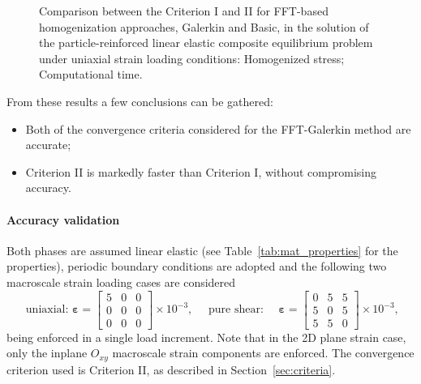 \begin{figure}[hbt]
\begin{subfigure}[b]{0.46\textwidth}
    \caption{}
    \label{subfig:linear_3D_normal_comparison_crit_cpu_time_vs_n_voxels}
  \end{subfigure}
  \caption{Comparison between the Criterion I and II for FFT-based homogenization
  approaches, Galerkin and Basic, in the solution of the particle-reinforced linear elastic
  composite equilibrium problem under uniaxial strain loading conditions:
   Homogenized
  stress; 
  Computational time.} \label{fig:linear_3D_normal_comparison_crit}
\end{figure}

From these results a few conclusions can be gathered:
\begin{itemize}
  \item Both of the convergence criteria considered for the FFT-Galerkin method are accurate;
  \item Criterion II is markedly faster than Criterion I, without compromising accuracy.
\end{itemize}

\FloatBarrier

\paragraph{Accuracy validation}
Both phases are assumed linear elastic (see Table~\ref{tab:mat_properties} for the properties), periodic boundary conditions are adopted and the following two macroscale strain loading cases are considered
\begin{equation}
\text { uniaxial: } \bm{\varepsilon}=\left[\begin{array}{lll}
5 & 0 & 0 \\
0 & 0 & 0 \\
0 & 0 & 0
\end{array}\right] \times 10^{-3}, \quad \text { pure shear: } \quad \bm \varepsilon=\left[\begin{array}{ccc}
0 & 5 & 5 \\
5 & 0 & 5 \\
5 & 5 & 0
\end{array}\right] \times 10^{-3},
\end{equation}
being enforced in a single load increment.
Note that in the 2D plane strain case, only the inplane \(O_{x y}\) macroscale strain components are enforced.
The convergence criterion used is Criterion II, as described in Section~\ref{sec:criteria}.

